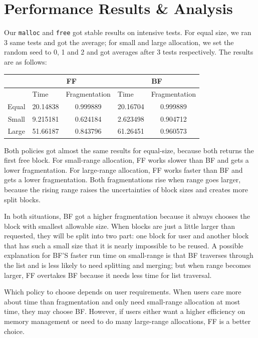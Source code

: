 \documentclass[a4paper,12pt]{article}
\begin{document}
	\section{Performance Results \& Analysis}
	\par Our \texttt{malloc} and \texttt{free} got stable results on intensive tests. For equal size, we ran 3 same tests and got the average; for small and large allocation, we set the random seed to 0, 1 and 2 and got averages after 3 tests respectively. The results are as follows:
\begin{table}[H]
  \centering
    \begin{tabular}{c|c|c|c|c}
          & \multicolumn{2}{c|}{FF} & \multicolumn{2}{c}{BF} \\
    \hline
          & \multicolumn{1}{l|}{Time} & \multicolumn{1}{l|}{Fragmentation} & \multicolumn{1}{l|}{Time} & \multicolumn{1}{l}{Fragmentation} \\
    \hline
    Equal & 20.14838 & 0.999889 & 20.16704 & 0.999889 \\
    \hline
    Small & 9.215181 & 0.624184 & 2.623498 & 0.904712 \\
    \hline
    Large & 51.66187 & 0.843796 & 61.26451 & 0.960573 
    \end{tabular}
\end{table}
	\par Both policies got almost the same results for equal-size, because both returns the first free block. For small-range allocation, FF works slower than BF and gets a lower fragmentation. For large-range allocation, FF works faster than BF and gets a lower fragmentation. Both fragmentations rise when range goes larger, because the rising range raises the uncertainties of block sizes and creates more split blocks. 
	\par In both situations, BF got a higher fragmentation because it always chooses the block with smallest allowable size. When blocks are just a little larger than requested, they will be split into two part: one block for user and another block that has such a small size that it is nearly impossible to be reused. A possible explanation for BF'S faster run time on small-range is that BF traverses through the list and is less likely to need splitting and merging; but when range becomes larger, FF overtakes BF because it needs less time for list traversal. 
	\par Which policy to choose depends on user requirements. When users care more about time than fragmentation and only need small-range allocation at most time, they may choose BF. However, if users either want a higher efficiency on memory management or need to do many large-range allocations, FF is a better choice. 
	
\end{document}
